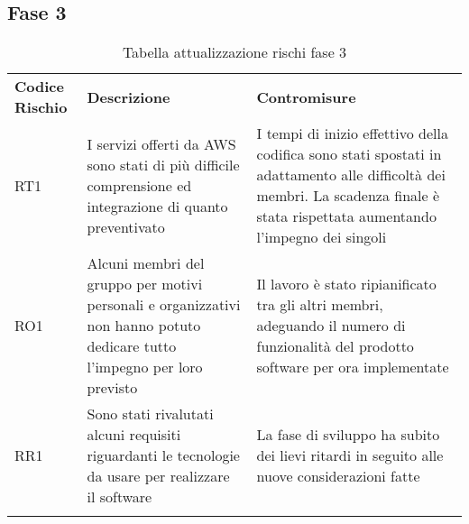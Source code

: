 \subsection{Fase 3}
\label{sec:fase_3}
\begin{center}
\renewcommand{\arraystretch}{1.5}
	\begin{longtable}[H]{  	>{\Centering}p{2cm}	
							>{\RaggedRight}p{6cm}	
							>{\RaggedRight}p{6cm}  
							}
							
		\rowcolor{tableHeadYellow}
		\textbf{Codice Rischio}   & \textbf{Descrizione} & \textbf{Contromisure}\\ 
		RT1	&	I servizi offerti da AWS sono stati di più difficile comprensione ed integrazione di quanto preventivato & I tempi di inizio effettivo della codifica sono stati spostati in adattamento alle difficoltà dei membri. La scadenza finale è stata rispettata aumentando l'impegno dei singoli\\
		RO1	&	Alcuni membri del gruppo per motivi personali e organizzativi non hanno potuto dedicare tutto l'impegno per loro previsto & Il lavoro è stato ripianificato tra gli altri membri, adeguando il numero di funzionalità del prodotto software per ora implementate\\
		RR1	&	Sono stati rivalutati alcuni requisiti riguardanti le tecnologie da usare per realizzare il software & La fase di sviluppo ha subito dei lievi ritardi in seguito alle nuove considerazioni fatte\\
		
		\rowcolor{white}
		\caption{Tabella attualizzazione rischi fase 3}
	\end{longtable}
\end{center}
